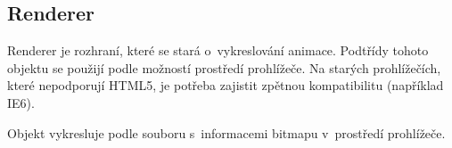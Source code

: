 \subsection{Renderer}

Renderer je rozhraní, které se stará o~vykreslování animace. Podtřídy tohoto objektu se použijí podle možností prostředí prohlížeče. Na starých prohlížečích, které nepodporují HTML5, je potřeba zajistit zpětnou kompatibilitu (například IE6).

Objekt vykresluje podle souboru s~informacemi bitmapu v~prostředí prohlížeče. 
